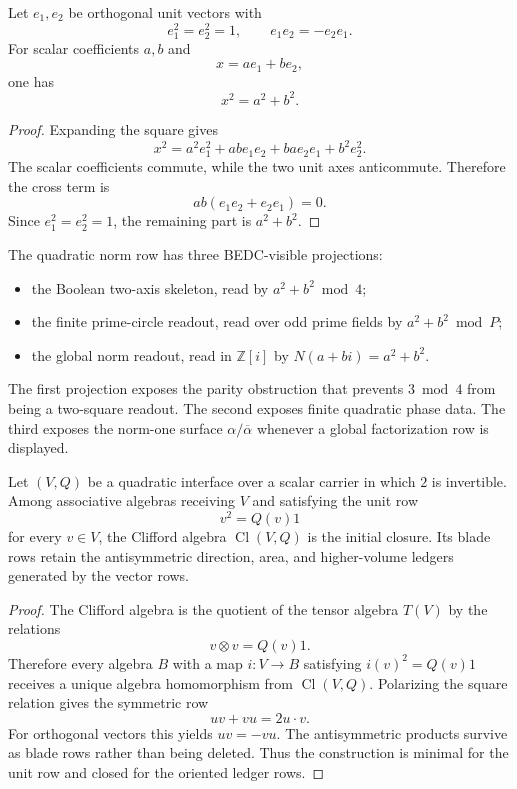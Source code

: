 \begin{theorem}
\label{thm:philosophy-pythagorean-square-two-axis-unit-readout}
Let $e_1,e_2$ be orthogonal unit vectors with
$$
e_1^2=e_2^2=1,
\qquad
e_1e_2=-e_2e_1.
$$
For scalar coefficients $a,b$ and
$$
x=ae_1+be_2,
$$
one has
$$
x^2=a^2+b^2.
$$
\end{theorem}
\begin{proof}
Expanding the square gives
$$
x^2=
a^2e_1^2
+ab e_1e_2
+ba e_2e_1
+b^2e_2^2.
$$
The scalar coefficients commute, while the two unit axes anticommute.
Therefore the cross term is
$$
ab(e_1e_2+e_2e_1)=0.
$$
Since $e_1^2=e_2^2=1$, the remaining part is $a^2+b^2$.
\end{proof}

\begin{definition}
\label{def:philosophy-quadratic-norm-three-level-readout}
The quadratic norm row has three BEDC-visible projections:
\begin{itemize}
\item the Boolean two-axis skeleton, read by $a^2+b^2\bmod 4$;
\item the finite prime-circle readout, read over odd prime fields by
$a^2+b^2\bmod P$;
\item the global norm readout, read in $\mathbb Z[i]$ by
$N(a+bi)=a^2+b^2$.
\end{itemize}
The first projection exposes the parity obstruction that prevents
$3\bmod 4$ from being a two-square readout. The second exposes finite
quadratic phase data. The third exposes the norm-one surface
$\alpha/\overline{\alpha}$ whenever a global factorization row is
displayed.
\end{definition}

\begin{theorem}
\label{thm:philosophy-clifford-minimal-three-property-closure}
Let $(V,Q)$ be a quadratic interface over a scalar carrier in which $2$
is invertible. Among associative algebras receiving $V$ and satisfying
the unit row
$$
v^2=Q(v)1
$$
for every $v\in V$, the Clifford algebra $\operatorname{Cl}(V,Q)$ is the
initial closure. Its blade rows retain the antisymmetric direction,
area, and higher-volume ledgers generated by the vector rows.
\end{theorem}
\begin{proof}
The Clifford algebra is the quotient of the tensor algebra $T(V)$ by the
relations
$$
v\otimes v=Q(v)1.
$$
Therefore every algebra $B$ with a map $i:V\to B$ satisfying
$i(v)^2=Q(v)1$ receives a unique algebra homomorphism from
$\operatorname{Cl}(V,Q)$. Polarizing the square relation gives the
symmetric row
$$
uv+vu=2u\cdot v.
$$
For orthogonal vectors this yields $uv=-vu$. The antisymmetric products
survive as blade rows rather than being deleted. Thus the construction is
minimal for the unit row and closed for the oriented ledger rows.
\end{proof}

